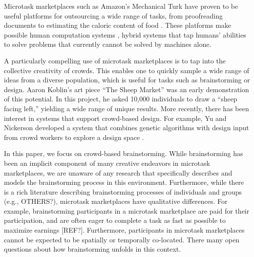 
Microtask marketplaces such as Amazon's Mechanical Turk have proven to be useful platforms for outsourcing a wide range of tasks, from proofreading documents \cite{soylent} to estimating the caloric content of food \cite{platemate}.  These platforms make possible human computation systems \cite{quinn_2011}, hybrid systems that tap humans' abilities to solve problems that currently cannot be solved by machines alone.

A particularly compelling use of microtask marketplaces is to tap into the collective creativity of crowds. This enables one to quickly sample a wide range of ideas from a diverse population, which is useful for tasks such as brainstorming or design. Aaron Koblin's art piece ``The Sheep Market'' \cite{koblin_2009} was an early demonstration of this potential. In this project, he asked 10,000 individuals to draw a ``sheep facing left,'' yielding a wide range of unique results. More recently, there has been interest in systems that support crowd-based design. For example, Yu and Nickerson developed a system that combines genetic algorithms with design input from crowd workers to explore a design space \cite{yu_cooks_2011}. 

In this paper, we focus on crowd-based brainstorming. While brainstorming has been an implicit component of many creative endeavors in microtask marketplaces, we are unaware of any research that specifically describes and models the brainstorming process in this environment. Furthermore, while there is a rich literature describing brainstorming processes of individuals and groups (e.g., \cite{osborn_applied_1957, pinsonneault_electronic_1999, nijstad_how_2006} OTHERS?), microtask marketplaces have qualitative differences. For example, brainstorming participants in a microtask marketplace are paid for their participation, and are often eager to complete a task as fast as possible to maximize earnings [REF?]. Furthermore, participants in microtask marketplaces cannot be expected to be spatially or temporally co-located. There many open questions about how brainstorming unfolds in this context.

